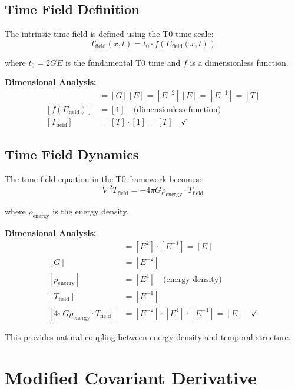 \documentclass[12pt,a4paper]{report}
\newcommand{\tzero}{t_0}                  %
\begin{document}
\subsection{Time Field Definition}
\label{subsec:time_field_definition}

The intrinsic time field is defined using the T0 time scale:
\begin{equation}
	T_{\text{field}}(x,t) = \tzero \cdot f(E_{\text{field}}(x,t))
\end{equation}

where $\tzero = 2GE$ is the fundamental T0 time and $f$ is a dimensionless function.

\textbf{Dimensional Analysis:}
\begin{align}
	[\tzero] &= [G][E] = [E^{-2}][E] = [E^{-1}] = [T] \\
	[f(E_{\text{field}})] &= [1] \quad \text{(dimensionless function)} \\
	[T_{\text{field}}] &= [T] \cdot [1] = [T] \quad \checkmark
\end{align}

\subsection{Time Field Dynamics}
\label{subsec:time_field_dynamics}

The time field equation in the T0 framework becomes:
\begin{equation}
	\nabla^2 T_{\text{field}} = -4\pi G \rho_{\text{energy}} \cdot T_{\text{field}}
\end{equation}

where $\rho_{\text{energy}}$ is the energy density.

\textbf{Dimensional Analysis:}
\begin{align}
	[\nabla^2 T_{\text{field}}] &= [E^2] \cdot [E^{-1}] = [E] \\
	[G] &= [E^{-2}] \\
	[\rho_{\text{energy}}] &= [E^4] \quad \text{(energy density)} \\
	[T_{\text{field}}] &= [E^{-1}] \\
	[4\pi G \rho_{\text{energy}} \cdot T_{\text{field}}] &= [E^{-2}] \cdot [E^4] \cdot [E^{-1}] = [E] \quad \checkmark
\end{align}

This provides natural coupling between energy density and temporal structure.
\section{Modified Covariant Derivative}
	\label{sec:modified_covariant_derivative}
	
\end{document}
